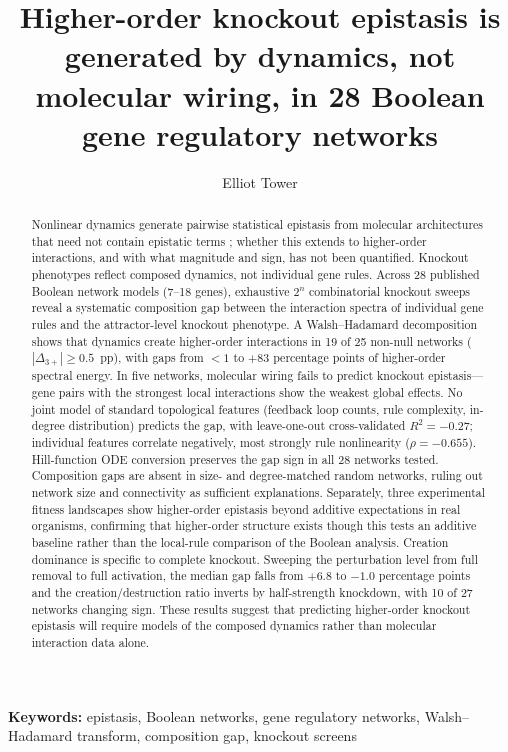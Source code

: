 \documentclass[10pt]{article}
\title{Higher-order knockout epistasis is generated by dynamics, not
molecular wiring, in 28 Boolean gene regulatory networks}
\author{Elliot Tower}
\affil{Visiting Researcher, University of Edinburgh \\ \texttt{elliot@mechanisticresearch.org}}
\begin{document}
\maketitle
\linenumbers
\doublespacing

\begin{abstract}
Nonlinear dynamics generate pairwise statistical epistasis from
molecular architectures that need not contain epistatic terms
\citep{gjuvsland2007statistical}; whether this extends to
higher-order interactions, and with what magnitude and sign, has not
been quantified. Knockout phenotypes reflect composed dynamics, not
individual gene rules. Across 28 published Boolean network models (7--18 genes), exhaustive
$2^n$ combinatorial knockout sweeps reveal a systematic composition
gap between the interaction spectra of individual gene rules and the
attractor-level knockout phenotype. A Walsh--Hadamard decomposition
shows that dynamics create higher-order interactions
in 19 of 25 non-null networks ($|\Delta_{3+}| \geq 0.5$~pp), with
gaps from $< 1$ to $+83$ percentage points of higher-order spectral
energy. In five networks, molecular wiring fails to predict knockout
epistasis---gene pairs with the strongest local interactions show the
weakest global effects. No joint model of standard
topological features (feedback loop counts, rule complexity,
in-degree distribution) predicts the gap, with leave-one-out
cross-validated $R^2 = -0.27$; individual features correlate
negatively, most strongly rule nonlinearity ($\rho = -0.655$). Hill-function ODE conversion preserves the gap sign in
all 28 networks tested. Composition gaps are absent in size- and
degree-matched random networks, ruling out network size and
connectivity as sufficient explanations. Separately, three experimental
fitness
landscapes show higher-order epistasis beyond additive expectations
in real organisms, confirming that higher-order structure exists
though this tests an additive baseline rather than the local-rule
comparison of the Boolean analysis. Creation dominance is specific to complete
knockout. Sweeping the perturbation level from full removal to full
activation, the median gap falls from $+6.8$ to $-1.0$ percentage points
and the creation/destruction ratio inverts by half-strength knockdown,
with 10 of 27 networks changing sign. These results suggest that predicting higher-order knockout
epistasis will require models of the composed dynamics rather than
molecular interaction data alone.
\end{abstract}

\noindent\textbf{Keywords:}
epistasis, Boolean networks, gene regulatory networks,
Walsh--Hadamard transform, composition gap, knockout screens
\end{document}
